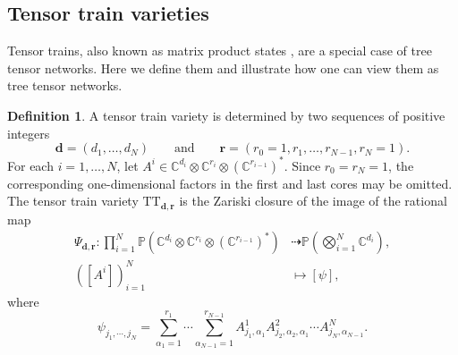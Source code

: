 \documentclass[12pt]{article}
\theoremstyle{definition}
\newtheorem{definition}[theorem]{Definition}
\numberwithin{theorem}{section}
\newcommand{\CC}{\mathbb{C}}
\begin{document}
\subsection{Tensor train varieties} \label{sec:tensor train varieties}
Tensor trains, also known as matrix product states \cite{Schollwoeck2011}, are a special case of tree tensor networks. Here we define them and illustrate how one can view them as tree tensor networks.

\begin{definition}
A tensor train variety is determined by two sequences of positive
integers
\[
\mathbf d=(d_1,\ldots,d_N)
\qquad\text{and}\qquad
\mathbf r=(r_0=1,r_1,\ldots,r_{N-1},r_N=1).
\]
For each $i=1,\ldots,N$, let $A^i
\in
\CC^{d_i}
\otimes
\mathbb C^{r_i}
\otimes
(\mathbb C^{r_{i-1}})^*$.
Since $r_0=r_N=1$, the corresponding one-dimensional factors in
the first and last cores may be omitted.
The tensor train variety $\mathrm{TT}_{\mathbf d,\mathbf r}$ is
the Zariski closure of the image of the rational map \cite[Section 5]{BFHP25}
\begin{equation}\label{eq:tensor-train-param}
\begin{aligned}
\Psi_{\mathbf d,\mathbf r}:
\prod_{i=1}^N
\mathbb P\left(
\CC^{d_i}
\otimes
\mathbb C^{r_i}
\otimes
(\mathbb C^{r_{i-1}})^*
\right)
&\dashrightarrow
\mathbb P\left(
\bigotimes_{i=1}^N \CC^{d_i}
\right),\\
([A^i])_{i=1}^N
&\longmapsto
[\psi],
\end{aligned}
\end{equation}
where
\begin{equation}\label{eq:TT-entries}
\psi_{j_1,\cdots ,j_N}
=
\sum_{\alpha_1=1}^{r_1}
\cdots
\sum_{\alpha_{N-1}=1}^{r_{N-1}}
A^1_{j_1,\alpha_1}
A^2_{j_2,\alpha_2,\alpha_1}
\cdots
A^N_{j_N,\alpha_{N-1}}.
\end{equation}
\end{definition}
\end{document}
